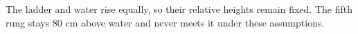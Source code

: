 The ladder and water rise equally, so their relative heights remain fixed. The fifth rung stays $80$ cm above water and $\boxed{\text{never}}$ meets it under these assumptions.

